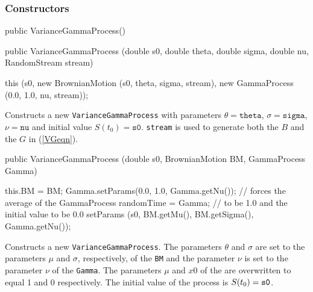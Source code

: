 \subsubsection* {Constructors}
\begin{code}\begin{hide}

   public VarianceGammaProcess() {} \end{hide}

   public VarianceGammaProcess (double s0, double theta, double sigma,
                                double nu, RandomStream stream) \begin{hide} {
        this (s0, new BrownianMotion (s0, theta, sigma, stream),
                  new GammaProcess (0.0, 1.0, nu, stream));
    }\end{hide}
\end{code}
\begin{tabb}
Constructs a new \texttt{VarianceGammaProcess} with parameters
$\theta = \texttt{theta}$, $\sigma = \texttt{sigma}$, $\nu = \texttt{nu}$
and initial value $S(t_{0}) = \texttt{s0}$.
\texttt{stream} is used to generate both the  $B$ and the
 $G$ in (\ref{VGeqn}).
\end{tabb}
\begin{code}

   public VarianceGammaProcess (double s0, BrownianMotion BM,
                                GammaProcess Gamma) \begin{hide} {
        this.BM         = BM;
        Gamma.setParams(0.0, 1.0, Gamma.getNu());  // forces the average of the GammaProcess
        randomTime      = Gamma;                   // to be 1.0 and the initial value to be 0.0
        setParams (s0, BM.getMu(), BM.getSigma(), Gamma.getNu());
    }\end{hide}
\end{code}
\begin{tabb}
Constructs a new \texttt{VarianceGammaProcess}.
The parameters $\theta$ and  $\sigma$ are set to the parameters $\mu$ and
$\sigma$, respectively, of the  \texttt{BM} and
the parameter $\nu$ is set to the parameter $\nu$ of the 
\texttt{Gamma}. The parameters $\mu$ and $x0$ of the  are
overwritten to equal 1 and 0 respectively.
The initial value of the process is $S(t_{0}) = {\tt s0}$.
\end{tabb}

